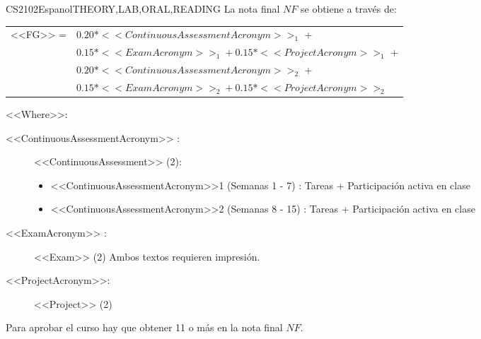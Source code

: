   \begin{evaluation}{CS2102}{Espanol}{THEORY,LAB,ORAL,READING}
  La nota final $NF$ se obtiene a través de:
 
  \begin{tabular}{cl}
      <<FG>> = & $0.20*<<ContinuousAssessmentAcronym>>_{1}$ +\\
               & $0.15*<<ExamAcronym>>_{1} + 0.15*<<ProjectAcronym>>_{1}$ + \\
               & $0.20*<<ContinuousAssessmentAcronym>>_{2}$ + \\
               & $0.15*<<ExamAcronym>>_{2} + 0.15*<<ProjectAcronym>>_{2}$
  \end{tabular}

  \noindent <<Where>>:
  \begin{description}
            \item[ <<ContinuousAssessmentAcronym>> :] <<ContinuousAssessment>> (2):
            \begin{itemize}
                \item <<ContinuousAssessmentAcronym>>1 (Semanas 1 - 7) : Tareas + Participación activa en clase
                \item <<ContinuousAssessmentAcronym>>2 (Semanas 8 - 15) : Tareas + Participación activa en clase
            \end{itemize}
      \item[<<ExamAcronym>> :] <<Exam>> (2) Ambos textos requieren impresión.
      \item[<<ProjectAcronym>>:] <<Project>> (2)
 
  \end{description}
  \noindent Para aprobar el curso hay que obtener 11 o más en la nota final $NF$.
  \end{evaluation}
 
